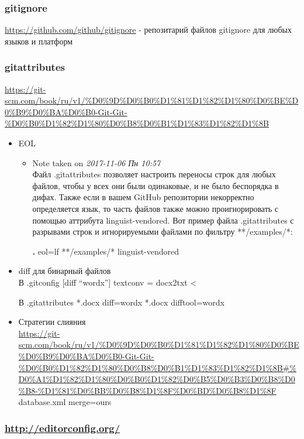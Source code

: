 \documentclass[bigger]{beamer}
\begin{document}
\begin{frame}
\frametitle{gitignore}
\label{sec-2-2}

\href{https://github.com/github/gitignore}{https://github.com/github/gitignore} - репозитарий файлов gitignore для
любых языков и платформ
\end{frame}
\begin{frame}
\frametitle{gitattributes}
\label{sec-2-3}

\href{https://git-scm.com/book/ru/v1/%D0%9D%D0%B0%D1%81%D1%82%D1%80%D0%BE%D0%B9%D0%BA%D0%B0-Git-Git-%D0%B0%D1%82%D1%80%D0%B8%D0%B1%D1%83%D1%82%D1%8B}{https://git-scm.com/book/ru/v1/\%D0\%9D\%D0\%B0\%D1\%81\%D1\%82\%D1\%80\%D0\%BE\%D0\%B9\%D0\%BA\%D0\%B0-Git-Git-\%D0\%B0\%D1\%82\%D1\%80\%D0\%B8\%D0\%B1\%D1\%83\%D1\%82\%D1\%8B}
\begin{itemize}

\item EOL
\label{sec-2-3-1}%
\begin{itemize}
\item Note taken on \textit{2017-11-06 Пн 10:57} \\
Файл .gitattributes позволяет настроить переносы строк для любых
  файлов, чтобы у всех они были одинаковые, и не было беспорядка в
  дифах. Также если в вашем GitHub репозитории некорректно определяется
  язык, то часть файлов также можно проигнорировать с помощью аттрибута
  linguist-vendored. Вот пример файла .gitattributes с \n разрывами
  строк и игнорируемыми файлами по фильтру **/examples/*:
  
  \textbf{.} eol=lf
  **/examples/* linguist-vendored
\end{itemize}

\item diff для бинарный файлов\\
\label{sec-2-3-2}%
В .gitconfig 
[diff ``wordx'']
     textconv = docx2txt <

В .gitattributes
*.docx diff=wordx
*.docx difftool=wordx


\item Стратегии слияния\\
\label{sec-2-3-3}%
\href{https://git-scm.com/book/ru/v1/%D0%9D%D0%B0%D1%81%D1%82%D1%80%D0%BE%D0%B9%D0%BA%D0%B0-Git-Git-%D0%B0%D1%82%D1%80%D0%B8%D0%B1%D1%83%D1%82%D1%8B#%D0%A1%D1%82%D1%80%D0%B0%D1%82%D0%B5%D0%B3%D0%B8%D0%B8-%D1%81%D0%BB%D0%B8%D1%8F%D0%BD%D0%B8%D1%8F}{https://git-scm.com/book/ru/v1/\%D0\%9D\%D0\%B0\%D1\%81\%D1\%82\%D1\%80\%D0\%BE\%D0\%B9\%D0\%BA\%D0\%B0-Git-Git-\%D0\%B0\%D1\%82\%D1\%80\%D0\%B8\%D0\%B1\%D1\%83\%D1\%82\%D1\%8B\#\%D0\%A1\%D1\%82\%D1\%80\%D0\%B0\%D1\%82\%D0\%B5\%D0\%B3\%D0\%B8\%D0\%B8-\%D1\%81\%D0\%BB\%D0\%B8\%D1\%8F\%D0\%BD\%D0\%B8\%D1\%8F}
database.xml merge=ours
\end{itemize} %
\end{frame}
\begin{frame}
\frametitle{\href{http://editorconfig.org/}{http://editorconfig.org/}}
\label{sec-2-4}
\end{frame}
\end{document}
